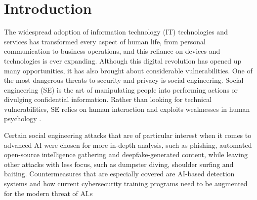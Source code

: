 




\chapter{Introduction\label{intro}}

The widespread adoption of information technology (IT) technologies and services has transformed every aspect of human life, from personal communication to business operations, and this reliance on devices and technologies is ever expanding. Although this digital revolution has opened up many opportunities, it has also brought about considerable vulnerabilities. One of the most dangerous threats to security and privacy is social engineering. Social engineering (SE) is the art of manipulating people into performing actions or divulging confidential information. Rather than looking for technical vulnerabilities, SE relies on human interaction and exploits weaknesses in human psychology \citep{wang_defining_2020}.

Certain social engineering attacks that are of particular interest when it comes to advanced AI were chosen for more in-depth analysis, such as phishing, automated open-source intelligence gathering and deepfake-generated content, while leaving other attacks with less focus, such as dumpster diving, shoulder surfing and baiting. Countermeasures that are especially covered are AI-based detection systems and how current cybersecurity training programs need to be augmented for the modern threat of AI.s



